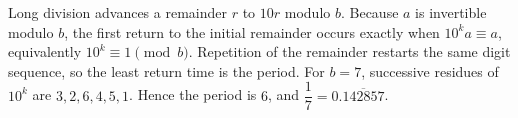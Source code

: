 Long division advances a remainder $ r $ to $ 10r $ modulo $ b $. Because $ a $ is invertible modulo $ b $, the first return to the initial remainder occurs exactly when $ 10^ka\equiv a $, equivalently $ 10^k\equiv1\pmod b $. Repetition of the remainder restarts the same digit sequence, so the least return time is the period. For $ b=7 $, successive residues of $ 10^k $ are $ 3,2,6,4,5,1 $. Hence the period is $\boxed6 $, and $\dfrac{1}{7}=0.\overline{142857}$.

